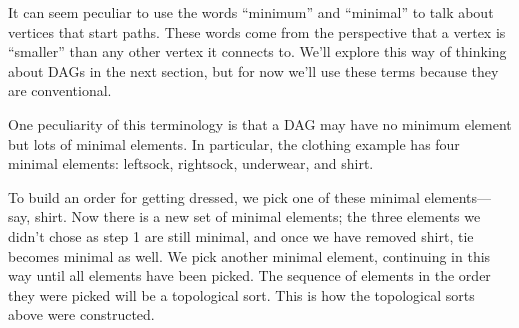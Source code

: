 It can seem peculiar to use the words ``minimum'' and ``minimal'' to
talk about vertices that start paths.  These words come from the
perspective that a vertex is ``smaller'' than any other vertex it
connects to.  We'll explore this way of thinking about DAGs in the
next section, but for now we'll use these terms because they
are conventional.

One peculiarity of this terminology is that a DAG may have no minimum
element but lots of minimal elements.  In particular, the clothing
example has four minimal elements: leftsock, rightsock, underwear, and
shirt.

\iffalse
In a topological sort, minimum and minimal elements are the same thing.
\fi

To build an order for getting dressed, we pick one of these minimal
elements---say, shirt.  Now there is a new set of minimal elements;
the three elements we didn't chose as step 1 are still minimal, and once
we have removed shirt, tie becomes minimal as well.  We pick
another minimal element, continuing in this way until all elements
have been picked.  The sequence of elements in the order they were
picked will be a topological sort.  This is how the topological sorts
above were constructed.

